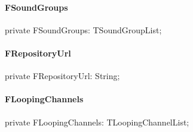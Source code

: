 \documentclass{report}
\begin{document}
\paragraph*{FSoundGroups}\hspace*{\fill}

\begin{list}{}{
\setlength{\itemindent}{0cm}
\setlength{\listparindent}{0cm}
\setlength{\leftmargin}{\evensidemargin}
\addtolength{\leftmargin}{\tmplength}
\settowidth{\labelsep}{X}
\addtolength{\leftmargin}{\labelsep}
\setlength{\labelwidth}{\tmplength}
}
\begin{flushleft}
\item[\textbf{Declaration}\hfill]
\begin{ttfamily}
private FSoundGroups: TSoundGroupList;\end{ttfamily}


\end{flushleft}
\end{list}
\paragraph*{FRepositoryUrl}\hspace*{\fill}

\begin{list}{}{
\setlength{\itemindent}{0cm}
\setlength{\listparindent}{0cm}
\setlength{\leftmargin}{\evensidemargin}
\addtolength{\leftmargin}{\tmplength}
\settowidth{\labelsep}{X}
\addtolength{\leftmargin}{\labelsep}
\setlength{\labelwidth}{\tmplength}
}
\begin{flushleft}
\item[\textbf{Declaration}\hfill]
\begin{ttfamily}
private FRepositoryUrl: String;\end{ttfamily}


\end{flushleft}
\end{list}
\paragraph*{FLoopingChannels}\hspace*{\fill}

\begin{list}{}{
\setlength{\itemindent}{0cm}
\setlength{\listparindent}{0cm}
\setlength{\leftmargin}{\evensidemargin}
\addtolength{\leftmargin}{\tmplength}
\settowidth{\labelsep}{X}
\addtolength{\leftmargin}{\labelsep}
\setlength{\labelwidth}{\tmplength}
}
\begin{flushleft}
\item[\textbf{Declaration}\hfill]
\begin{ttfamily}
private FLoopingChannels: TLoopingChannelList;\end{ttfamily}


\end{flushleft}
\end{list}
\end{document}
